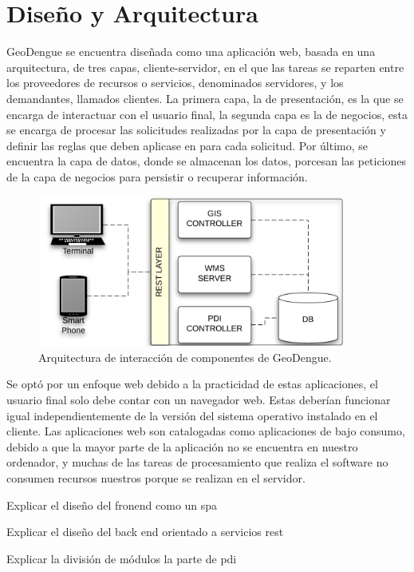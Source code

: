 \section{Diseño y Arquitectura}
GeoDengue se encuentra diseñada como una aplicación web, basada en una arquitectura, de tres capas,
cliente-servidor, en el que las tareas se reparten entre los proveedores de recursos o servicios,
denominados servidores, y los demandantes, llamados clientes. La primera capa, la de presentación,
es la que se encarga de interactuar con el usuario final, la segunda capa es la de negocios, esta
se encarga de procesar las solicitudes realizadas por la capa de presentación y definir las reglas
que deben aplicase en para cada solicitud. Por último, se encuentra la capa de datos, donde se
almacenan los datos, porcesan las peticiones de la capa de negocios para persistir o recuperar
información.

\begin{figure}
\centering
\includegraphics[width=0.9\textwidth]{capitulo-5/graphics/arquitectura-completa.png}
\caption{\label{fig:arquitectura-completa}Arquitectura de interacción de componentes de GeoDengue.}
\end{figure}

Se optó por un enfoque web debido a la practicidad de estas aplicaciones, el usuario final solo
debe contar con un navegador web. Estas deberían funcionar igual independientemente de la versión
del sistema operativo instalado en el cliente. Las aplicaciones web son catalogadas como
aplicaciones de bajo consumo, debido a que la mayor parte de la aplicación no se encuentra en
nuestro ordenador, y muchas de las tareas de procesamiento que realiza el software no consumen
recursos nuestros porque se realizan en el servidor.


Explicar el diseño del fronend como un spa

Explicar el diseño del back end orientado a servicios rest

Explicar la división de módulos la parte de pdi


